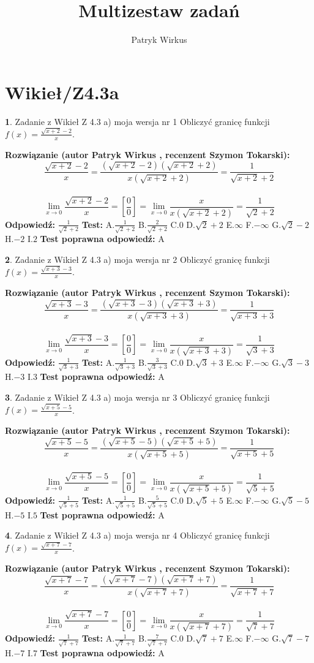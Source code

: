 \documentclass[12pt, a4paper]{article}
\title{Multizestaw zadań}
\author{Patryk Wirkus}
\date{}
\theoremstyle{definition} %
\newtheorem{zad}{}
\newcommand{\kategoria}[1]{\section{#1}}
\newcommand{\zadStart}[1]{\begin{zad}#1\newline}
\newcommand{\zadStop}{\end{zad}}
\newcommand{\rozwStart}[2]{\noindent \textbf{Rozwiązanie (autor #1 , recenzent #2): }\newline}
\newcommand{\rozwStop}{\newline}
\newcommand{\odpStart}{\noindent \textbf{Odpowiedź:}\newline}
\newcommand{\odpStop}{\newline}
\newcommand{\testStart}{\noindent \textbf{Test:}\newline}
\newcommand{\testStop}{\newline}
\newcommand{\kluczStart}{\noindent \textbf{Test poprawna odpowiedź:}\newline}
\newcommand{\kluczStop}{\newline}
\begin{document}
\maketitle

\kategoria{Wikieł/Z4.3a}


\zadStart{Zadanie z Wikieł Z 4.3 a) moja wersja nr 1}
Obliczyć granicę funkcji $f(x)=\frac{\sqrt{x+2}-2}{x}$.
\zadStop
\rozwStart{Patryk Wirkus}{Szymon Tokarski}
$$\frac{\sqrt{x+2}-2}{x}=\frac{(\sqrt{x+2}-2)(\sqrt{x+2}+2)}{x(\sqrt{x+2}+2)}=\frac{1}{\sqrt{x+2}+2}$$
\\
$$\lim\limits_{x\to0}\frac{\sqrt{x+2}-2}{x}=[\frac{0}{0}]=
\lim\limits_{x\to0}\frac{x}{x(\sqrt{x+2}+2)} = \frac{1}{\sqrt{2}+2}$$
\rozwStop
\odpStart
$\frac{1}{\sqrt{2}+2}$
\odpStop
\testStart
A.$\frac{1}{\sqrt{2}+2}$
B.$\frac{2}{\sqrt{2}+2}$
C.$0$
D.$\sqrt{2}+2$
E.$\infty$
F.$-\infty$
G.$\sqrt{2}-2$
H.$-2$
I.$2$
\testStop
\kluczStart
A
\kluczStop



\zadStart{Zadanie z Wikieł Z 4.3 a) moja wersja nr 2}
Obliczyć granicę funkcji $f(x)=\frac{\sqrt{x+3}-3}{x}$.
\zadStop
\rozwStart{Patryk Wirkus}{Szymon Tokarski}
$$\frac{\sqrt{x+3}-3}{x}=\frac{(\sqrt{x+3}-3)(\sqrt{x+3}+3)}{x(\sqrt{x+3}+3)}=\frac{1}{\sqrt{x+3}+3}$$
\\
$$\lim\limits_{x\to0}\frac{\sqrt{x+3}-3}{x}=[\frac{0}{0}]=
\lim\limits_{x\to0}\frac{x}{x(\sqrt{x+3}+3)} = \frac{1}{\sqrt{3}+3}$$
\rozwStop
\odpStart
$\frac{1}{\sqrt{3}+3}$
\odpStop
\testStart
A.$\frac{1}{\sqrt{3}+3}$
B.$\frac{3}{\sqrt{3}+3}$
C.$0$
D.$\sqrt{3}+3$
E.$\infty$
F.$-\infty$
G.$\sqrt{3}-3$
H.$-3$
I.$3$
\testStop
\kluczStart
A
\kluczStop



\zadStart{Zadanie z Wikieł Z 4.3 a) moja wersja nr 3}
Obliczyć granicę funkcji $f(x)=\frac{\sqrt{x+5}-5}{x}$.
\zadStop
\rozwStart{Patryk Wirkus}{Szymon Tokarski}
$$\frac{\sqrt{x+5}-5}{x}=\frac{(\sqrt{x+5}-5)(\sqrt{x+5}+5)}{x(\sqrt{x+5}+5)}=\frac{1}{\sqrt{x+5}+5}$$
\\
$$\lim\limits_{x\to0}\frac{\sqrt{x+5}-5}{x}=[\frac{0}{0}]=
\lim\limits_{x\to0}\frac{x}{x(\sqrt{x+5}+5)} = \frac{1}{\sqrt{5}+5}$$
\rozwStop
\odpStart
$\frac{1}{\sqrt{5}+5}$
\odpStop
\testStart
A.$\frac{1}{\sqrt{5}+5}$
B.$\frac{5}{\sqrt{5}+5}$
C.$0$
D.$\sqrt{5}+5$
E.$\infty$
F.$-\infty$
G.$\sqrt{5}-5$
H.$-5$
I.$5$
\testStop
\kluczStart
A
\kluczStop



\zadStart{Zadanie z Wikieł Z 4.3 a) moja wersja nr 4}
Obliczyć granicę funkcji $f(x)=\frac{\sqrt{x+7}-7}{x}$.
\zadStop
\rozwStart{Patryk Wirkus}{Szymon Tokarski}
$$\frac{\sqrt{x+7}-7}{x}=\frac{(\sqrt{x+7}-7)(\sqrt{x+7}+7)}{x(\sqrt{x+7}+7)}=\frac{1}{\sqrt{x+7}+7}$$
\\
$$\lim\limits_{x\to0}\frac{\sqrt{x+7}-7}{x}=[\frac{0}{0}]=
\lim\limits_{x\to0}\frac{x}{x(\sqrt{x+7}+7)} = \frac{1}{\sqrt{7}+7}$$
\rozwStop
\odpStart
$\frac{1}{\sqrt{7}+7}$
\odpStop
\testStart
A.$\frac{1}{\sqrt{7}+7}$
B.$\frac{7}{\sqrt{7}+7}$
C.$0$
D.$\sqrt{7}+7$
E.$\infty$
F.$-\infty$
G.$\sqrt{7}-7$
H.$-7$
I.$7$
\testStop
\kluczStart
A
\kluczStop
\end{document}
